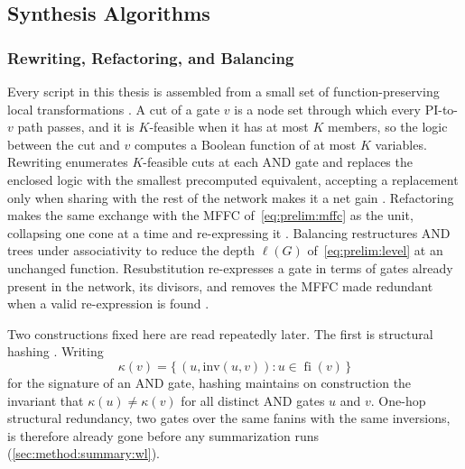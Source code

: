 \subsection{Synthesis Algorithms}
\label{sec:prelim:algorithms}

\subsubsection{Rewriting, Refactoring, and Balancing}
\label{sec:prelim:algorithms:primitives}
Every script in this thesis is assembled from a small set of function-preserving local
transformations \citep{mishchenko2006rewriting}. A cut of a gate $v$ is a node set through
which every PI-to-$v$ path passes, and it is $K$-feasible when it has at most $K$ members,
so the logic between the cut and $v$ computes a Boolean function of at most $K$ variables.
Rewriting enumerates $K$-feasible cuts at each AND gate and replaces the enclosed logic
with the smallest precomputed equivalent, accepting a replacement only when sharing with
the rest of the network makes it a net gain
\citep{bjesse2004compression,mishchenko2006rewriting}. Refactoring makes the same exchange
with the MFFC of~\eqref{eq:prelim:mffc} as the unit, collapsing one cone at a time and
re-expressing it \citep{mishchenko2006scalable}. Balancing restructures AND trees under
associativity to reduce the depth $\ell(G)$ of~\eqref{eq:prelim:level} at an unchanged
function. Resubstitution re-expresses a gate in terms of gates already present in the
network, its divisors, and removes the MFFC made redundant when a valid re-expression is
found \citep{mishchenko2006scalable}.

Two constructions fixed here are read repeatedly later. The first is structural hashing
\citep{kuehlmann2002robust}. Writing
\begin{equation}
    \kappa(v) = \bigl\{\, (u, \mathrm{inv}(u, v)) : u \in \operatorname{fi}(v) \,\bigr\}
    \label{eq:prelim:strash}
\end{equation}
for the signature of an AND gate, hashing maintains on construction the invariant that
$\kappa(u) \neq \kappa(v)$ for all distinct AND gates $u$ and $v$. One-hop structural
redundancy, two gates over the same fanins with the same inversions, is therefore already
gone before any summarization runs (\ref{sec:method:summary:wl}).

